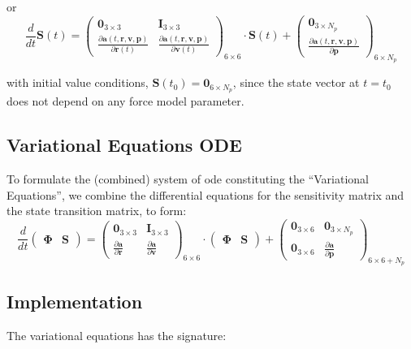 or
\begin{equation}
  \frac{d}{dt} \bm{S}(t) = 
  \begin{pmatrix}
    \bm{0}_{3 \times 3} & \bm{I}_{3 \times 3} \\
    \frac{\partial \bm{a}(t, \bm{r}, \bm{v}, \bm{p})}{\partial \bm{r}(t)} & 
    \frac{\partial \bm{a}(t, \bm{r}, \bm{v}, \bm{p})}{\partial \bm{v}(t)}
  \end{pmatrix}_{6 \times 6}
  \cdot \bm{S}(t)
  + \begin{pmatrix}
    \bm{0}_{3 \times N_p} \\
    \frac{\partial \bm{a}(t, \bm{r}, \bm{v}, \bm{p})}{\partial \bm{p}}
  \end{pmatrix}_{6 \times N_p}
\end{equation}

with initial value conditions, $\bm{S}(t_0) = \bm{0}_{6 \times N_p}$, since 
the state vector at $t=t_0$ does not depend on any force model parameter.

\subsection{Variational Equations ODE}
\label{ssec:ode-variational-equations}

To formulate the (combined) system of \gls{ode} constituting the ``Variational Equations'', 
we combine the differential equations for the sensitivity matrix and the state 
transition matrix, to form:
\begin{equation}
  \frac{d}{dt} \begin{pmatrix} \bm{\Phi} & \bm{S} \end{pmatrix} 
  = 
  \begin{pmatrix} 
    \bm{0}_{3 \times 3} & \bm{I}_{3 \times 3} \\
    \frac{\partial \bm{a}}{\partial \bm{r}} & 
    \frac{\partial \bm{a}}{\partial \bm{v}}
  \end{pmatrix}_{6 \times 6} \cdot 
  \begin{pmatrix} \bm{\Phi} & \bm{S} \end{pmatrix}
  +
  \begin{pmatrix} 
    \bm{0}_{3 \times 6} & \bm{0}_{3 \times N_p} \\
    \bm{0}_{3 \times 6} & \frac{\partial \bm{a}}{\partial \bm{p}}
  \end{pmatrix}_{6 \times 6+N_p}
\end{equation}


\subsection{Implementation}
The variational equations has the signature:

